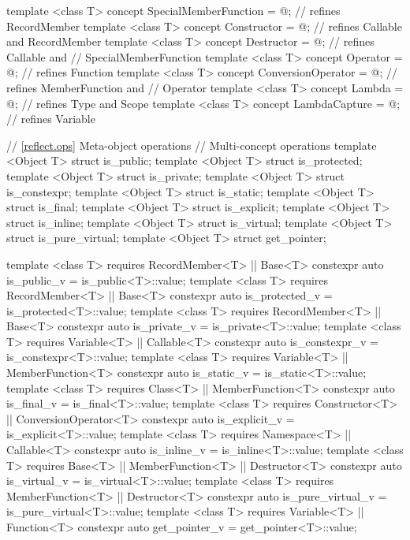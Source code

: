 \begin{std.txt}
\begin{codeblock}
{{template <class T> concept SpecialMemberFunction = @\seebelow@; // refines RecordMember
template <class T> concept Constructor = @\seebelow@;    // refines Callable and RecordMember
template <class T> concept Destructor = @\seebelow@;     // refines Callable and
                                                       // SpecialMemberFunction
template <class T> concept Operator = @\seebelow@;       // refines Function
template <class T> concept ConversionOperator = @\seebelow@; // refines MemberFunction and
                                                           // Operator
template <class T> concept Lambda = @\seebelow@;         // refines Type and Scope
template <class T> concept LambdaCapture = @\seebelow@;  // refines Variable


// \ref{reflect.ops} Meta-object operations
// Multi-concept operations
template <Object T> struct is_public;
template <Object T> struct is_protected;
template <Object T> struct is_private;
template <Object T> struct is_constexpr;
template <Object T> struct is_static;
template <Object T> struct is_final;
template <Object T> struct is_explicit;
template <Object T> struct is_inline;
template <Object T> struct is_virtual;
template <Object T> struct is_pure_virtual;
template <Object T> struct get_pointer;

template <class T>
requires RecordMember<T> || Base<T>
  constexpr auto is_public_v = is_public<T>::value;
template <class T>
requires RecordMember<T> || Base<T>
  constexpr auto is_protected_v = is_protected<T>::value;
template <class T>
requires RecordMember<T> || Base<T>
  constexpr auto is_private_v = is_private<T>::value;
template <class T>
requires Variable<T> || Callable<T>
   constexpr auto is_constexpr_v = is_constexpr<T>::value;
template <class T>
requires Variable<T> || MemberFunction<T>
   constexpr auto is_static_v = is_static<T>::value;
template <class T>
requires Class<T> || MemberFunction<T>
   constexpr auto is_final_v = is_final<T>::value;
template <class T>
requires Constructor<T> || ConversionOperator<T>
   constexpr auto is_explicit_v = is_explicit<T>::value;
template <class T>
requires Namespace<T> || Callable<T>
   constexpr auto is_inline_v = is_inline<T>::value;
template <class T>
requires Base<T> || MemberFunction<T> || Destructor<T>
   constexpr auto is_virtual_v = is_virtual<T>::value;
template <class T>
requires MemberFunction<T> || Destructor<T>
   constexpr auto is_pure_virtual_v = is_pure_virtual<T>::value;
template <class T>
requires Variable<T> || Function<T>
   constexpr auto get_pointer_v = get_pointer<T>::value;

}}
\end{codeblock}
\end{std.txt}

